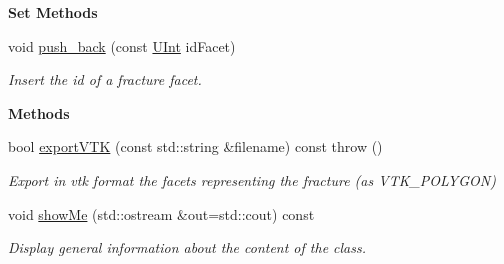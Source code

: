 \begin{Indent}{\bf Set Methods}\par
\begin{DoxyCompactItemize}
\item 
void \hyperlink{classFVCode3D_1_1Fracture3D_a8511764a838f561a17bff2013892a24c}{push\+\_\+back} (const \hyperlink{namespaceFVCode3D_a4bf7e328c75d0fd504050d040ebe9eda}{U\+Int} id\+Facet)
\begin{DoxyCompactList}\small\item\em Insert the id of a fracture facet. \end{DoxyCompactList}\end{DoxyCompactItemize}
\end{Indent}
\begin{Indent}{\bf Methods}\par
\begin{DoxyCompactItemize}
\item 
bool \hyperlink{classFVCode3D_1_1Fracture3D_a1043c8fc93b79a1cea8d67d8adb2a418}{export\+V\+TK} (const std\+::string \&filename) const   throw ()
\begin{DoxyCompactList}\small\item\em Export in vtk format the facets representing the fracture (as V\+T\+K\+\_\+\+P\+O\+L\+Y\+G\+ON) \end{DoxyCompactList}\item 
void \hyperlink{classFVCode3D_1_1Fracture3D_a35cf7c9104e494422e41a87faae74d65}{show\+Me} (std\+::ostream \&out=std\+::cout) const 
\begin{DoxyCompactList}\small\item\em Display general information about the content of the class. \end{DoxyCompactList}\end{DoxyCompactItemize}
\end{Indent}
